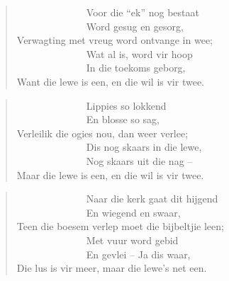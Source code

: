 \begin{verse}
\ \ \ \ \ \ \ \ \ \ \ \ \ \ Voor die ``ek'' nog bestaat \\
\ \ \ \ \ \ \ \ \ \ \ \ \ \ Word gesug en gesorg, \\
Verwagting met vreug word ontvange in wee; \\
\ \ \ \ \ \ \ \ \ \ \ \ \ \ Wat al is, word vir hoop \\
\ \ \ \ \ \ \ \ \ \ \ \ \ \ In die toekoms geborg, \\
Want die lewe is een, en die wil is vir twee. \\
\end{verse}

\begin{verse}
\ \ \ \ \ \ \ \ \ \ \ \ \ \ Lippies so lokkend \\
\ \ \ \ \ \ \ \ \ \ \ \ \ \ En blosse so sag, \\
Verleilik die ogies nou, dan weer verlee; \\
\ \ \ \ \ \ \ \ \ \ \ \ \ \ Dis nog skaars in die lewe, \\
\ \ \ \ \ \ \ \ \ \ \ \ \ \ Nog skaars uit die nag -- \\
Maar die lewe is een, en die wil is vir twee. \\
\end{verse}

\begin{verse}
\ \ \ \ \ \ \ \ \ \ \ \ \ \ Naar die kerk gaat dit hijgend \\
\ \ \ \ \ \ \ \ \ \ \ \ \ \ En wiegend en swaar, \\
Teen die boesem verlep moet die bijbeltjie leen; \\
\ \ \ \ \ \ \ \ \ \ \ \ \ \ Met vuur word gebid \\
\ \ \ \ \ \ \ \ \ \ \ \ \ \ En gevlei -- Ja dis waar, \\
Die lus is vir meer, maar die lewe’s net een. \\
\end{verse}